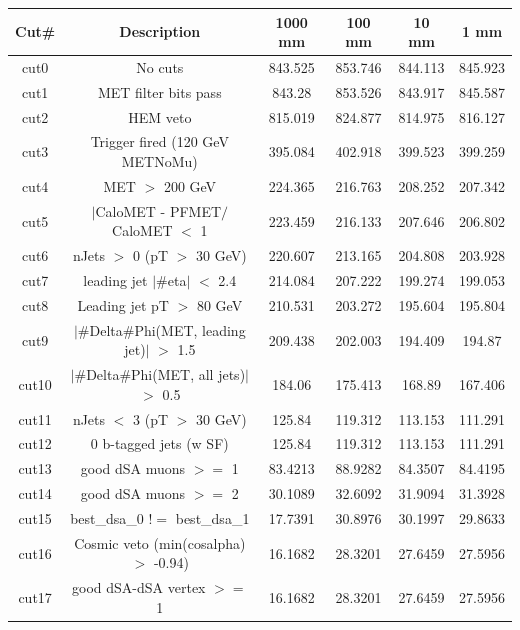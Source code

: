 \documentclass{article}
\begin{document}
    \begin{table}[H]
        \centering
        \begin{tabular}{||c|c|c|c|c|c||}
            \hline
            Cut# & Description & 1000 mm & 100 mm & 10 mm & 1 mm \\
            \hline
            cut0 & No cuts & 843.525 & 853.746 & 844.113 & 845.923 \\
            cut1 & MET filter bits pass & 843.28 & 853.526 & 843.917 & 845.587 \\
            cut2 & HEM veto & 815.019 & 824.877 & 814.975 & 816.127 \\
            cut3 & Trigger fired (120 GeV METNoMu) & 395.084 & 402.918 & 399.523 & 399.259 \\
            cut4 & MET $>$ 200 GeV & 224.365 & 216.763 & 208.252 & 207.342 \\
            cut5 & $|$CaloMET - PFMET$/$CaloMET $<$ 1 & 223.459 & 216.133 & 207.646 & 206.802 \\
            cut6 & nJets $>$ 0 (pT $>$ 30 GeV) & 220.607 & 213.165 & 204.808 & 203.928 \\
            cut7 & leading jet $|$#eta$|$ $<$ 2.4 & 214.084 & 207.222 & 199.274 & 199.053 \\
            cut8 & Leading jet pT $>$ 80 GeV & 210.531 & 203.272 & 195.604 & 195.804 \\
            cut9 & $|$#Delta#Phi(MET, leading jet)$|$ $>$ 1.5 & 209.438 & 202.003 & 194.409 & 194.87 \\
            cut10 & $|$#Delta#Phi(MET, all jets)$|$ $>$ 0.5 & 184.06 & 175.413 & 168.89 & 167.406 \\
            cut11 & nJets $<$ 3 (pT $>$ 30 GeV) & 125.84 & 119.312 & 113.153 & 111.291 \\
            cut12 & 0 b-tagged jets (w SF) & 125.84 & 119.312 & 113.153 & 111.291 \\
            cut13 & good dSA muons $>=$ 1 & 83.4213 & 88.9282 & 84.3507 & 84.4195 \\
            cut14 & good dSA muons $>=$ 2 & 30.1089 & 32.6092 & 31.9094 & 31.3928 \\
            cut15 & best\_dsa\_0 $!=$ best\_dsa\_1 & 17.7391 & 30.8976 & 30.1997 & 29.8633 \\
            cut16 & Cosmic veto (min(cosalpha) $>$ -0.94) & 16.1682 & 28.3201 & 27.6459 & 27.5956 \\
            cut17 & good dSA-dSA vertex $>=$ 1 & 16.1682 & 28.3201 & 27.6459 & 27.5956 \\

\end{tabular}
\end{table}
\end{document}
